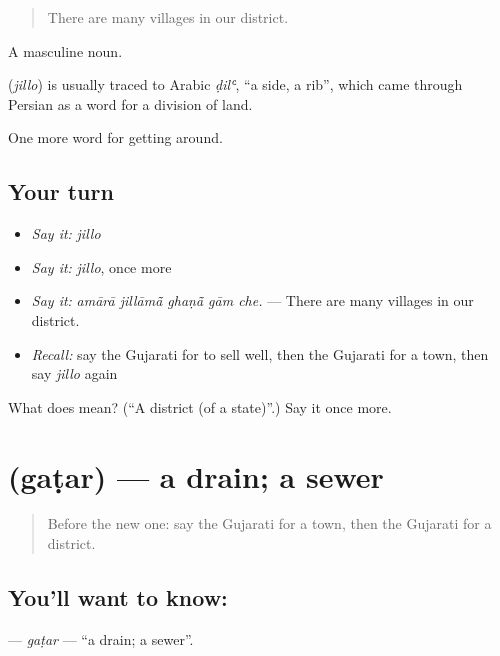 \begin{quote}
There are many villages in our district.
\end{quote}

A masculine noun.

\begin{cousinweb}
\textbf{} (\emph{jillo}) is usually traced to Arabic \emph{ḍilʿ}, \textquotedblleft{}a side, a rib\textquotedblright{}, which came through Persian as a word for a division of land.
\end{cousinweb}

\begin{grammarlens}[title={What you've built}]
One more word for getting around.
\end{grammarlens}

\subsection*{Your turn}
\begin{itemize}
\raggedright
  \item \emph{Say it:} \emph{jillo}
  \item \emph{Say it:} \emph{jillo}, once more
  \item \emph{Say it:} \emph{amārā jillāmā̃ ghaṇā̃ gām che.} — There are many villages in our district.
  \item \emph{Recall:} say the Gujarati for to sell well, then the Gujarati for a town, then say \emph{jillo} again
\end{itemize}

\begin{tcolorbox}[breakable,colback=teal!4,colframe=teal!35!black,title={Before you move on}]
What does  mean? (\textquotedblleft{}A district (of a state)\textquotedblright{}.) Say it once more.
\end{tcolorbox}
\section[\texorpdfstring{\gu{ગટર} (gaṭar)}{ગટર (gaṭar)}]{ (gaṭar) — a drain; a sewer}

\label{lesson:GU-C423-gatar}



\begin{quote}
Before the new one: say the Gujarati for a town, then the Gujarati for a district.
\end{quote}

\subsection*{You'll want to know: }
\textbf{} — \emph{gaṭar} — \textquotedblleft{}a drain; a sewer\textquotedblright{}.

